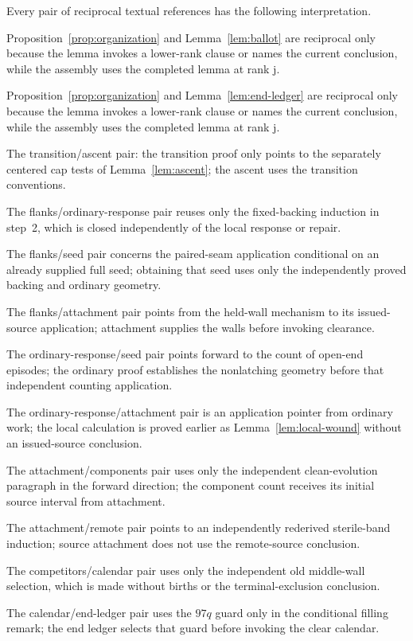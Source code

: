 Every pair of reciprocal textual references has the following interpretation.
\par\noindent Proposition~\ref{prop:organization} and Lemma~\ref{lem:ballot} are reciprocal only because the lemma invokes a lower-rank clause or names the current conclusion, while the assembly uses the completed lemma at rank j.
\par\noindent Proposition~\ref{prop:organization} and Lemma~\ref{lem:end-ledger} are reciprocal only because the lemma invokes a lower-rank clause or names the current conclusion, while the assembly uses the completed lemma at rank j.
\par\noindent The transition/ascent pair: the transition proof only points to the separately centered cap tests of Lemma~\ref{lem:ascent}; the ascent uses the transition conventions.
\par\noindent The flanks/ordinary-response pair reuses only the fixed-backing induction in step~2, which is closed independently of the local response or repair.
\par\noindent The flanks/seed pair concerns the paired-seam application conditional on an already supplied full seed; obtaining that seed uses only the independently proved backing and ordinary geometry.
\par\noindent The flanks/attachment pair points from the held-wall mechanism to its issued-source application; attachment supplies the walls before invoking clearance.
\par\noindent The ordinary-response/seed pair points forward to the count of open-end episodes; the ordinary proof establishes the nonlatching geometry before that independent counting application.
\par\noindent The ordinary-response/attachment pair is an application pointer from ordinary work; the local calculation is proved earlier as Lemma~\ref{lem:local-wound} without an issued-source conclusion.
\par\noindent The attachment/components pair uses only the independent clean-evolution paragraph in the forward direction; the component count receives its initial source interval from attachment.
\par\noindent The attachment/remote pair points to an independently rederived sterile-band induction; source attachment does not use the remote-source conclusion.
\par\noindent The competitors/calendar pair uses only the independent old middle-wall selection, which is made without births or the terminal-exclusion conclusion.
\par\noindent The calendar/end-ledger pair uses the \(97q\) guard only in the conditional filling remark; the end ledger selects that guard before invoking the clear calendar.


